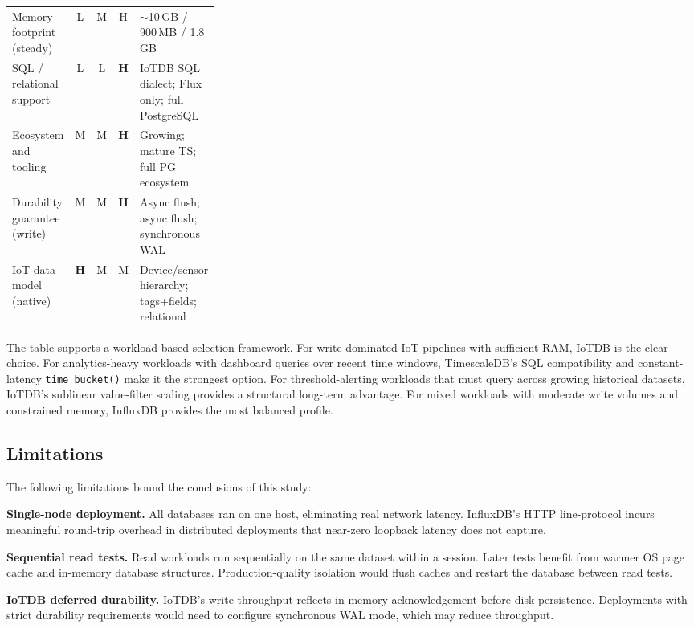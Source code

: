 \begin{table}[t]
\begin{tabular}{l c c c p{0.3\linewidth}}
    Memory footprint (steady)     & L & M & H & $\sim$10\,GB / 900\,MB / 1.8\,GB \\
    SQL / relational support      & L & L & \textbf{H} & IoTDB SQL dialect; Flux only; full PostgreSQL \\
    Ecosystem and tooling         & M & M & \textbf{H} & Growing; mature TS; full PG ecosystem \\
    Durability guarantee (write)  & M & M & \textbf{H} & Async flush; async flush; synchronous WAL \\
    IoT data model (native)       & \textbf{H} & M & M & Device/sensor hierarchy; tags+fields; relational \\
    \hline
  \end{tabular}
\end{table}

The table supports a workload-based selection framework. For write-dominated IoT pipelines
with sufficient RAM, IoTDB is the clear choice. For analytics-heavy workloads with dashboard
queries over recent time windows, TimescaleDB's SQL compatibility and constant-latency
\texttt{time\_bucket()} make it the strongest option. For threshold-alerting workloads that
must query across growing historical datasets, IoTDB's sublinear value-filter scaling
provides a structural long-term advantage. For mixed workloads with moderate write volumes
and constrained memory, InfluxDB provides the most balanced profile.

\subsection{Limitations}
\label{sec:limitations}

The following limitations bound the conclusions of this study:

\textbf{Single-node deployment.} All databases ran on one host, eliminating real network
latency. InfluxDB's HTTP line-protocol incurs meaningful round-trip overhead in distributed
deployments that near-zero loopback latency does not capture.

\textbf{Sequential read tests.} Read workloads run sequentially on the same dataset within
a session. Later tests benefit from warmer OS page cache and in-memory database structures.
Production-quality isolation would flush caches and restart the database between read tests.

\textbf{IoTDB deferred durability.} IoTDB's write throughput reflects in-memory
acknowledgement before disk persistence. Deployments with strict durability requirements
would need to configure synchronous WAL mode, which may reduce throughput.

